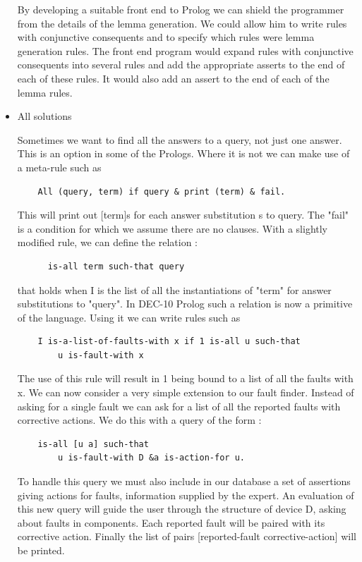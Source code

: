 \documentclass[14pt]{article}
\begin{document}
\begin{itemize}
By developing a suitable front end to Prolog we can shield the 
programmer from the details of the lemma generation. We could allow him
to write rules with conjunctive consequents and to specify which rules 
were lemma generation rules. The front end program would expand rules 
with conjunctive consequents into several rules and add the appropriate
asserts to the end of each of these rules. It would also add an assert
to the end of each of the lemma rules.

\item All solutions 

Sometimes we want to find all the answers to a query, not just one 
answer. This is an option in some of the Prologs. Where it is not we can
make use of a meta-rule such as 
\begin{verbatim}
	All (query, term) if query & print (term) & fail.
\end{verbatim}
This will print out [term]s for each answer substitution s to query. 
The "fail" is a condition for which we assume there are no clauses. 
With a slightly modified rule, we can define the relation :
\begin{verbatim}	
	  is-all term such-that query 
\end{verbatim}
that holds when I is the list of all the instantiations of "term" for 
answer substitutions to "query". In DEC-10 Prolog such a relation is now
a primitive of the language. Using it we can write rules such as 
\begin{verbatim}
	I is-a-list-of-faults-with x if 1 is-all u such-that 
		u is-fault-with x 
\end{verbatim}
The use of this rule will result in 1 being bound to a list of all the 
faults with x. We can now consider a very simple extension to our fault 
finder. Instead of asking for a single fault we can ask for a list of 
all the reported faults with corrective actions. We do this with a 
query of the form : 
\begin{verbatim}
	is-all [u a] such-that 
		u is-fault-with D &a is-action-for u. 
\end{verbatim}

To handle this query we must also include in our database a set of 
assertions giving actions for faults, information supplied by the 
expert. An evaluation of this new query will guide the user through the
structure of device D, asking about faults in components. Each reported
fault will be paired with its corrective action. Finally the list of 
pairs [reported-fault corrective-action] will be printed.


\end{itemize}
\end{document}

